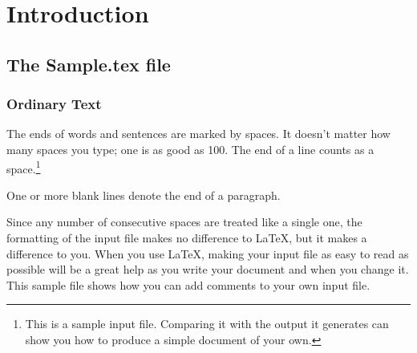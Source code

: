 %
\chapter{Introduction}\label{introduction}   %
%
%
%
%
%
%
\section{The Sample.tex file}  %
%


\subsection{Ordinary Text}   %

The ends of words and sentences are marked by spaces. It doesn't matter
how many spaces you type; one is as good as 100.  The end of a line
counts as a space.\footnote{
This is a sample input file.  Comparing it with the output it
generates can show you how to produce a simple document of
your own.
}

One or more blank lines denote the end of a paragraph.

Since any number of consecutive spaces are treated like a single one,
the formatting of the input file makes no difference to \LaTeX,
but it makes a difference to you. When you use
\LaTeX,       %
making your input file as easy to read as possible will be a great help
as you write your document and when you change it.  This sample file
shows how you can add comments to your own input file.

